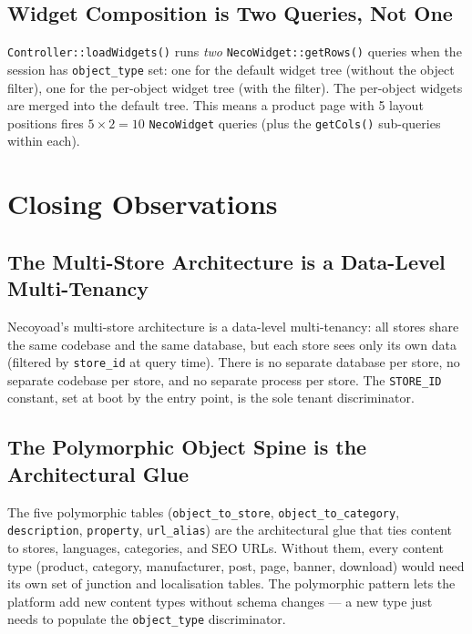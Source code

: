 \documentclass[11pt,a4paper]{article}
\begin{document}
\subsection{Widget Composition is Two Queries, Not One}

\texttt{Controller::loadWidgets()} runs \emph{two}
\texttt{NecoWidget::getRows()} queries when the session has
\texttt{object\_type} set: one for the default widget tree (without
the object filter), one for the per-object widget tree (with the
filter). The per-object widgets are merged into the default tree.
This means a product page with 5 layout positions fires
$5 \times 2 = 10$ \texttt{NecoWidget} queries (plus the
\texttt{getCols()} sub-queries within each).

\section{Closing Observations}\label{sec:observations}

\subsection{The Multi-Store Architecture is a Data-Level Multi-Tenancy}

Necoyoad's multi-store architecture is a data-level multi-tenancy:
all stores share the same codebase and the same database, but each
store sees only its own data (filtered by \texttt{store\_id} at query
time). There is no separate database per store, no separate codebase
per store, and no separate process per store. The
\texttt{STORE\_ID} constant, set at boot by the entry point, is the
sole tenant discriminator.

\subsection{The Polymorphic Object Spine is the Architectural Glue}

The five polymorphic tables (\texttt{object\_to\_store},
\texttt{object\_to\_category}, \texttt{description},
\texttt{property}, \texttt{url\_alias}) are the architectural glue
that ties content to stores, languages, categories, and SEO URLs.
Without them, every content type (product, category, manufacturer,
post, page, banner, download) would need its own set of junction and
localisation tables. The polymorphic pattern lets the platform add
new content types without schema changes --- a new type just needs
to populate the \texttt{object\_type} discriminator.
\end{document}
